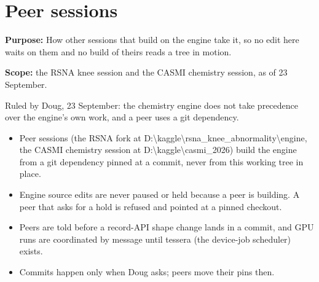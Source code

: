 \chapter{\texorpdfstring{Peer sessions}{Peer sessions}}
\label{chap:peer-sessions}

\textbf{Purpose:} How other sessions that build on the engine take it, so no edit here waits on them and no build of theirs reads a tree in motion.

\textbf{Scope:} the RSNA knee session and the CASMI chemistry session, as of 23 September.

Ruled by Doug, 23 September: the chemistry engine does not take precedence over the engine's own work, and a peer uses a git dependency.

\begin{itemize}
\item Peer sessions (the RSNA fork at D:\textbackslash{}kaggle\textbackslash{}rsna\_\allowbreak{}knee\_\allowbreak{}abnormality\textbackslash{}engine, the CASMI chemistry session at D:\textbackslash{}kaggle\textbackslash{}casmi\_\allowbreak{}2026) build the engine from a git dependency pinned at a commit, never from this working tree in place.
\item Engine source edits are never paused or held because a peer is building. A peer that asks for a hold is refused and pointed at a pinned checkout.
\item Peers are told before a record-API shape change lands in a commit, and GPU runs are coordinated by message until tessera (the device-job scheduler) exists.
\item Commits happen only when Doug asks; peers move their pins then.
\end{itemize}
